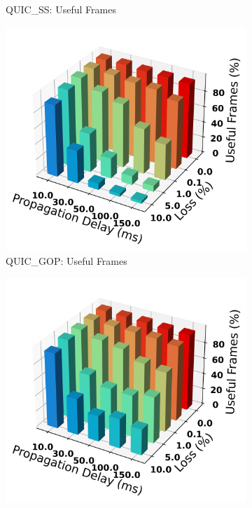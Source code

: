 \documentclass{mpaper}
\begin{document}
\begin{figure}
\begin{subfigure}[b]{0.25\textwidth}
      \caption{QUIC\_SS: Useful Frames}
      \label{fig:SS_bar-42}
  \end{subfigure}
  \hfill
  \begin{subfigure}[b]{0.25\textwidth}
      \centering
      \includegraphics[width=\textwidth]{Frame_Usefulness_Ratio/QUIC_GOP/AVG_Frame_Usefulness-42.png}
      \caption{QUIC\_GOP: Useful Frames}
      \label{fig:GOP_bar-42}
  \end{subfigure}
  \begin{subfigure}[b]{0.25\textwidth}
      \centering
      \includegraphics[width=\textwidth]{Frame_Usefulness_Ratio/QUIC_FPS/AVG_Frame_Usefulness-42.png}

\end{subfigure}
\end{figure}
\end{document}
